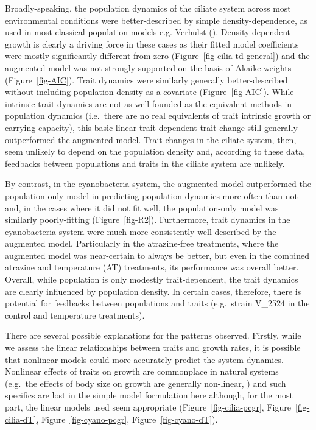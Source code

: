 \documentclass[
  letterpaper,
  DIV=11,
  numbers=noendperiod]{scrartcl}
\begin{document}
Broadly-speaking, the population dynamics of the ciliate system across
most environmental conditions were better-described by simple
density-dependence, as used in most classical population models e.g.
Verhulst (). Density-dependent growth
is clearly a driving force in these cases as their fitted model
coefficients were mostly significantly different from zero
(Figure~\ref{fig-cilia-td-general}) and the augmented model was not
strongly supported on the basis of Akaike weights
(Figure~\ref{fig-AIC}). Trait dynamics were similarly generally
better-described without including population density as a covariate
(Figure~\ref{fig-AIC}). While intrinsic trait dynamics are not as
well-founded as the equivalent methods in population dynamics
(i.e.~there are no real equivalents of trait intrinsic growth or
carrying capacity), this basic linear trait-dependent trait change still
generally outperformed the augmented model. Trait changes in the ciliate
system, then, seem unlikely to depend on the population density and,
according to these data, feedbacks between populations and traits in the
ciliate system are unlikely.

By contrast, in the cyanobacteria system, the augmented model
outperformed the population-only model in predicting population dynamics
more often than not and, in the cases where it did not fit well, the
population-only model was similarly poorly-fitting
(Figure~\ref{fig-R2}). Furthermore, trait dynamics in the cyanobacteria
system were much more consistently well-described by the augmented
model. Particularly in the atrazine-free treatments, where the augmented
model was near-certain to always be better, but even in the combined
atrazine and temperature (AT) treatments, its performance was overall
better. Overall, while population is only modestly trait-dependent, the
trait dynamics are clearly influenced by population density. In certain
cases, therefore, there is potential for feedbacks between populations
and traits (e.g.~strain V\_2524 in the control and temperature
treatments).

There are several possible explanations for the patterns observed.
Firstly, while we assess the linear relationships between traits and
growth rates, it is possible that nonlinear models could more accurately
predict the system dynamics. Nonlinear effects of traits on growth are
commonplace in natural systems (e.g.~the effects of body size on growth
are generally non-linear,
) and such specifics are lost in the simple model formulation here
although, for the most part, the linear models used seem appropriate
(Figure~\ref{fig-cilia-pcgr}, Figure~\ref{fig-cilia-dT},
Figure~\ref{fig-cyano-pcgr}, Figure~\ref{fig-cyano-dT}).
\end{document}
